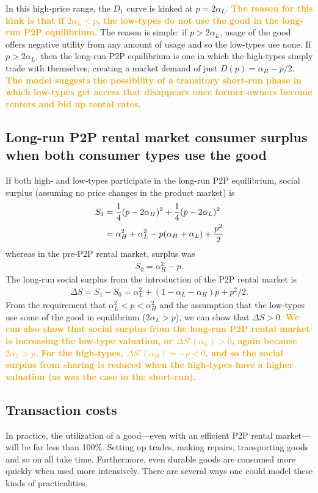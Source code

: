 \documentclass[11pt]{article}
\newcommand{\important}[1]{\textcolor{orange}{\textbf{#1}}}
\newcommand{\important}[1]{#1}
\begin{document}
In this high-price range, the $D_1$ curve is kinked at $p = 2\alpha_L$. 
\important{The reason for this kink is that if $2\alpha_L < p$, the low-types do not use the good in the long-run P2P equilibrium.} 
The reason is simple: if $p > 2\alpha_L$, usage of the good offers negative utility from any amount of usage and so the low-types use none. 
If $p > 2 \alpha_L$, then the long-run P2P equilibrium is one in which the high-types simply trade with themselves, creating a market demand of just $D(p) = \alpha_H - p/2$. 
\important{The model suggests the possibility of a transitory short-run phase in which low-types get access that disappears once former-owners become renters and bid up rental rates.} 

\subsection{Long-run P2P rental market consumer surplus when both consumer types use the good} 
If both high- and low-types participate in the long-run P2P equilibrium, social surplus (assuming no price changes in the product market) is 
\begin{align} 
S_1 & = \frac{1}{4}(p - 2\alpha_H)^2 + \frac{1}{4}(p - 2\alpha_L)^2 \notag \\
    & = \alpha_H^2 + \alpha_L^2 - p(\alpha_H + \alpha_L) + \frac{p^2}{2} \notag \\ 
\end{align} 
whereas in the pre-P2P rental market, surplus was 
\begin{align}
S_0 = \alpha_H^2 - p.  
\end{align} 
The long-run social surplus from the introduction of the P2P rental market is  
\begin{align}
\Delta S = S_1 - S_0 = \alpha_L^2 + (1 - \alpha_L - \alpha_H)p + p^2/2.  
\end{align} 
From the requirement that $\alpha_L^2 < p < \alpha_H^2$ and the assumption that the low-types use some of the good in equilibrium ($2 \alpha_L > p$), we can show that $\Delta S > 0$. 
\important{We can also show that social surplus from the long-run P2P rental market is increasing the low-type valuation, or $\Delta S'(\alpha_L) > 0$, again because $2\alpha_L > p$.}
\important{For the high-types, $\Delta S'(\alpha_H) = -p < 0$, and so the social surplus from sharing is 
reduced when the high-types have a higher valuation (as was the case in the short-run).}

\subsection{Transaction costs}
In practice, the utilization of a good---even with an efficient P2P rental market---will be far less than 100\%.
Setting up trades, making repairs, transporting goods and so on all take time.  
Furthermore, even durable goods are consumed more quickly when used more intensively. 
There are several ways one could model these kinds of practicalities. 
\end{document}
